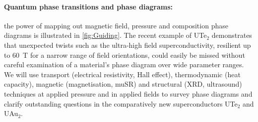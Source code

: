 \paragraph{Quantum phase transitions and phase diagrams:} 
the power of mapping out magnetic field, pressure and composition phase diagrams is illustrated in \autoref{fig:Guiding}. The recent example of UTe$_2$ demonstrates that unexpected twists such as the ultra-high field superconductivity, resilient up to \SI{60}{\tesla} for a narrow range of field orientations, could easily be missed without careful examination of a material's phase diagram over wide parameter ranges. 
We will use transport (electrical resistivity, Hall effect), thermodynamic (heat capacity), magnetic (magnetisation, muSR) and structural (XRD, ultrasound) techniques at applied pressure and in applied fields to survey phase diagrams and clarify outstanding questions in the comparatively new superconductors UTe$_2$ and UAu$_2$. 






